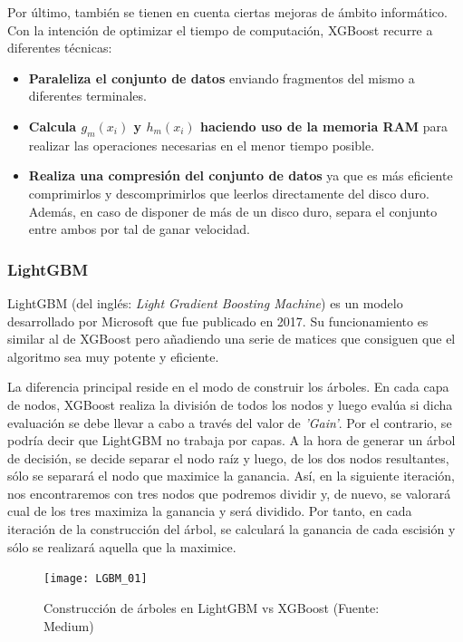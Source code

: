 \documentclass[12pt,twoside]{article}
\begin{document}
Por último, también se tienen en cuenta ciertas mejoras de ámbito informático. Con la intención de optimizar el tiempo de computación, XGBoost recurre a diferentes técnicas: 
\begin{itemize}
\item \textbf{Paraleliza el conjunto de datos} enviando fragmentos del mismo a diferentes terminales.

\item \textbf{Calcula $g_m(x_i)$ y $h_m(x_i)$ haciendo uso de la memoria RAM} para realizar las operaciones necesarias en el menor tiempo posible.

\item \textbf{Realiza una compresión del conjunto de datos} ya que es más eficiente comprimirlos y descomprimirlos que leerlos directamente del disco duro. Además, en caso de disponer de más de un disco duro, separa el conjunto entre ambos por tal de ganar velocidad.
\end{itemize}



\subsubsection{LightGBM}

LightGBM (del inglés: \textit{Light Gradient Boosting Machine}) es un modelo desarrollado por Microsoft que fue publicado en 2017. Su funcionamiento es similar al de XGBoost pero añadiendo una serie de matices que consiguen que el algoritmo sea muy potente y eficiente.

La diferencia principal reside en el modo de construir los árboles. En cada capa de nodos, XGBoost realiza la división de todos los nodos y luego evalúa si dicha evaluación se debe llevar a cabo a través del valor de \textit{'Gain'}. Por el contrario, se podría decir que LightGBM no trabaja por capas. A la hora de generar un árbol de decisión, se decide separar el nodo raíz y luego, de los dos nodos resultantes, sólo se separará el nodo que maximice la ganancia. Así, en la siguiente iteración, nos encontraremos con tres nodos que podremos dividir y, de nuevo, se valorará cual de los tres maximiza la ganancia y será dividido. Por tanto, en cada iteración de la construcción del árbol, se calculará la ganancia de cada escisión y sólo se realizará aquella que la maximice.

\begin{figure}[h]
\centering
\texttt{[image: LGBM\_01]}
\caption{Construcción de árboles en LightGBM vs XGBoost (Fuente: Medium)}
\end{figure}
\end{document}
